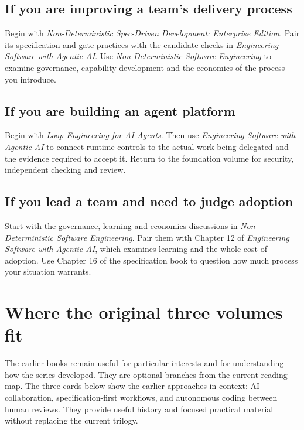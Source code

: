 \documentclass[11pt]{article}
\begin{document}
\subsection{If you are improving a team's delivery process}

Begin with \emph{Non-Deterministic Spec-Driven Development: Enterprise Edition}. Pair its specification and gate practices with the candidate checks in \emph{Engineering Software with Agentic AI}. Use \emph{Non-Deterministic Software Engineering} to examine governance, capability development and the economics of the process you introduce.

\subsection{If you are building an agent platform}

Begin with \emph{Loop Engineering for AI Agents}. Then use \emph{Engineering Software with Agentic AI} to connect runtime controls to the actual work being delegated and the evidence required to accept it. Return to the foundation volume for security, independent checking and review.

\begin{samepage}
\subsection{If you lead a team and need to judge adoption}

Start with the governance, learning and economics discussions in \emph{Non-Deterministic Software Engineering}. Pair them with Chapter 12 of \emph{Engineering Software with Agentic AI}, which examines learning and the whole cost of adoption. Use Chapter 16 of the specification book to question how much process your situation warrants.

\end{samepage}

\clearpage
\section{Where the original three volumes fit}

The earlier books remain useful for particular interests and for understanding how the series developed. They are optional branches from the current reading map. The three cards below show the earlier approaches in context: AI collaboration, specification-first workflows, and autonomous coding between human reviews. They provide useful history and focused practical material without replacing the current trilogy.
\end{document}
